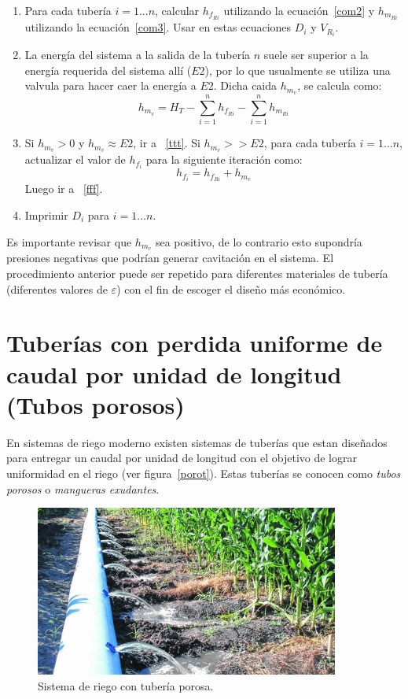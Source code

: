 \documentclass[11pt, oneside]{article}
\begin{document}
\begin{enumerate}
\item Para cada tuber\'ia $i=1...n$, calcular $h_{f_{Ri}}$ utilizando la ecuaci\'on~\ref{com2} y $h_{m_{Ri}}$  utilizando la ecuaci\'on~\ref{com3}. Usar en estas ecuaciones $D_i$ y $V_{R_i}$.
\item La energ\'ia del sistema a la salida de la tuber\'ia $n$ suele ser superior a la energ\'ia requerida del sistema all\'i ($E2$), por lo que usualmente se utiliza una valvula para hacer caer la energ\'ia a $E2$. Dicha caida $h_{m_v}$, se calcula como:
\begin{equation} 
h_{m_v} = H_T - \sum_{i=1}^n h_{f_{Ri}} - \sum_{i=1}^n h_{m_{Ri}}
\label{desp2}
\end{equation}
\item Si $h_{m_v} > 0$ y $h_{m_v} \approx E2$, ir a ~\ref{ttt}. Si $h_{m_v} >> E2$, para cada tuber\'ia $i=1...n$, actualizar el valor de $h_{f_i}$ para la siguiente iteraci\'on como:
\begin{equation} 
h_{f_i} = h_{f_{Ri}} + h_{m_v}
\label{desp3}
\end{equation}
Luego ir a ~\ref{fff}.

\item \label{ttt} Imprimir $D_i$ para $i=1...n$.

\end{enumerate}

Es importante revisar que $h_{m_v}$ sea positivo, de lo contrario esto supondr\'ia presiones negativas que podr\'ian generar cavitaci\'on en el sistema. El procedimiento anterior puede ser repetido para diferentes materiales de tuber\'ia (diferentes valores de $\varepsilon$) con el fin de escoger el dise\~no m\'as econ\'omico.


\section{Tuber\'ias con perdida uniforme de caudal por unidad de longitud (Tubos porosos)}
En sistemas de riego moderno existen sistemas de tuber\'ias que estan dise\~nados para entregar un caudal por unidad de longitud con el objetivo  de lograr uniformidad en el riego (ver figura~\ref{porot}). Estas tuber\'ias se conocen como \emph{tubos porosos} o \emph{mangueras exudantes}. 

\begin{figure}[h]
\centering
\includegraphics[width=10cm]{./figs/porot2.jpg}
\caption{Sistema de riego con tuber\'ia porosa.} 
\label{porot2}
\end{figure}
\end{document}
